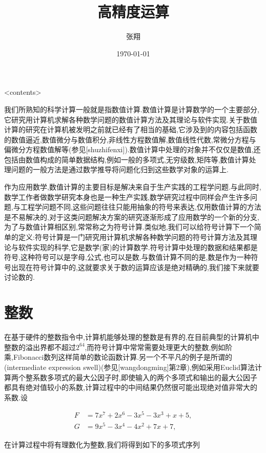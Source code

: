 \documentclass{ctexart}
\title{高精度运算}
\author{张翔}
\date{\today}
\newcommand\mtcasCite[1]{[#1]}
\theoremstyle{remark}
\theoremstyle{definition}
\begin{document}
\maketitle

<contents>

我们所熟知的科学计算一般就是指数值计算.数值计算是计算数学的一个主要部分,它研究用计算机求解各种数学问题的数值计算方法及其理论与软件实现.关于数值计算的研究在计算机被发明之前就已经有了相当的基础,它涉及到的内容包括函数的数值逼近,数值微分与数值积分,非线性方程数值解,数值线性代数,常微分方程与偏微分方程数值解等(参见\mtcasCite{shuzhifenxi}).数值计算中处理的对象并不仅仅是数值,还包括由数值构成的简单数据结构,例如一般的多项式,无穷级数,矩阵等,数值计算处理问题的一般方法是通过数学推导将问题化归到这些数学对象的运算上.

作为应用数学,数值计算的主要目标是解决来自于生产实践的工程学问题.与此同时,数学工作者做数学研究本身也是一种生产实践,数学研究过程中同样会产生许多问题,与工程学问题不同,这些问题往往只能用抽象的符号来表达,仅用数值计算的方法是不易解决的,对于这类问题解决方案的研究逐渐形成了应用数学的一个新的分支,为了与数值计算相区别,常常称之为符号计算.类似地,我们可以给符号计算下一个简单的定义:符号计算是一门研究用计算机求解各种数学问题的符号计算方法及其理论与软件实现的科学,它是数学(家)的计算数学.符号计算中处理的数据和结果都是符号,这种符号可以是字母,公式,也可以是数.与数值计算不同的是,数是作为一种符号出现在符号计算中的,这就要求关于数的运算应该是绝对精确的,我们接下来就要讨论数的.

\section{整数}

在基于硬件的整数指令中,计算机能够处理的整数是有界的,在目前典型的计算机中整数的溢出界都不超过$2^{64}$,而符号计算中常常需要处理更大的整数,例如阶乘,Fibonacci数列这样简单的数论函数计算.另一个不平凡的例子是所谓的(intermediate expression swell)(参见\mtcasCite{wangdongming}第2章),例如采用Euclid算法计算两个整系数多项式的最大公因子时,即使输入的两个多项式和输出的最大公因子都具有绝对值较小的系数,计算过程中的中间结果仍然很可能出现绝对值非常大的系数.设

\begin{align*}
  F&=7x^7+2x^6-3x^5-3x^3+x+5,\\
G&=9x^5-3x^4-4x^2+7x+7,
\end{align*}

在计算过程中将有理数化为整数,我们将得到如下的多项式序列
\end{document}
